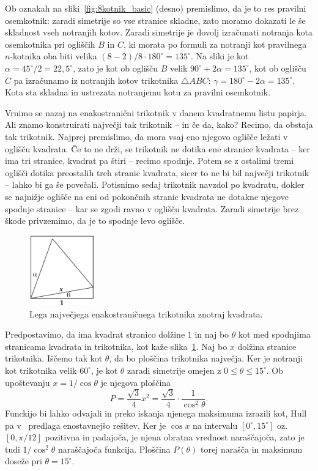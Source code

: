 Ob oznakah na sliki~\ref{fig:8kotnik_basic} (desno) premislimo, da je to res pravilni osemkotnik: zaradi simetrije so vse stranice skladne, zato moramo dokazati le še skladnost vseh notranjih kotov. Zaradi simetrije je dovolj izračunati notranja kota osemkotnika pri ogliščih $B$ in $C$, ki morata po formuli za notranji kot pravilnega $n$-kotnika oba biti velika $(8-2)/8 \cdot 180^\circ = 135^\circ$. Na sliki je kot $\alpha = 45^\circ /2 = 22{,}5^\circ$, zato je kot ob oglišču $B$ velik $90^\circ + 2\alpha = 135^\circ$, kot ob oglišču $C$ pa izračunamo iz notranjih kotov trikotnika $\triangle ABC$: $\gamma = 180^\circ - 2\alpha = 135^\circ$. Kota sta skladna in ustrezata notranjemu kotu za pravilni osemkotnik.

Vrnimo se nazaj na enakostranični trikotnik v danem kvadratnemu listu papirja. Ali znamo konstruirati največji tak trikotnik -- in če da, kako? Recimo, da obstaja tak trikotnik. Najprej premislimo, da mora vsaj eno njegovo oglišče ležati v oglišču kvadrata. Če to ne drži, se trikotnik ne dotika ene stranice kvadrata -- ker ima tri stranice, kvadrat pa štiri -- recimo spodnje. Potem se z ostalimi tremi oglišči dotika preostalih treh stranic kvadrata, sicer to ne bi bil največji trikotnik -- lahko bi ga še povečali. Potisnimo sedaj trikotnik navzdol po kvadratu, dokler se najnižje oglišče na eni od pokončnih stranic kvadrata ne dotakne njegove spodnje stranice -- kar se zgodi ravno v oglišču kvadrata. Zaradi simetrije brez škode privzemimo, da je to spodnje levo oglišče.

\begin{figure}[h]
    \centering
    \includegraphics[width=0.25\textwidth]{images/n-kotniki/trik_enak_max1.png}
    \caption[Lega največjega enakostraničnega trikotnika znotraj kvadrata]{Lega največjega enakostraničnega trikotnika znotraj kvadrata.}
    \label{fig:trik_enak_max1}
\end{figure}

Predpostavimo, da ima kvadrat stranico dolžine $1$ in naj bo $\theta$ kot med spodnjima stranicama kvadrata in trikotnika, kot kaže slika~\ref{fig:trik_enak_max1}. Naj bo $x$ dolžina stranice trikotnika. Iščemo tak kot $\theta$, da bo ploščina trikotnika največja. Ker je notranji kot trikotnika velik $60^\circ$, je kot $\theta$ zaradi simetrije omejen z $0 \leq \theta \leq 15^\circ$. Ob upoštevanju $x = 1/ \cos \theta$ je njegova ploščina
$$ P = \frac{\sqrt{3}}{4} x^2 = \frac{\sqrt{3}}{4} \cdot \frac{1}{\cos^2 \theta}. $$
Funckijo bi lahko odvajali in preko iskanja njenega maksimuma izrazili kot, Hull pa v~\cite[str.\ 11]{hull2013} predlaga enostavnejšo rešitev. Ker je $\cos x$ na intervalu $[0^\circ, 15^\circ]$ oz.\ $[0, \pi/12]$ pozitivna in padajoča, je njena obratna vrednost naraščajoča, zato je tudi $1/\cos^2\theta$ naraščajoča funkcija. Ploščina $P(\theta)$ torej narašča in maksimum doseže pri $\theta = 15^\circ$.

